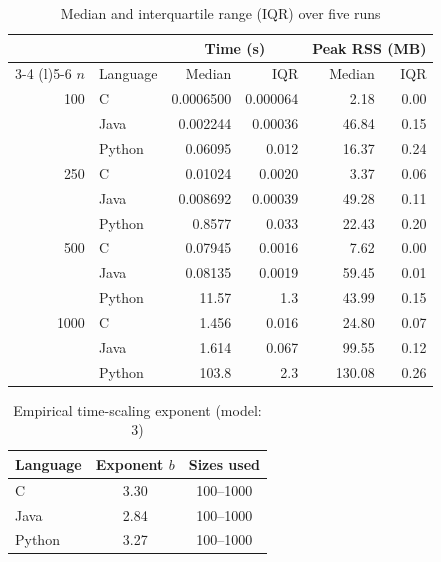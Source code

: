 \documentclass[conference,a4paper]{IEEEtran}
\begin{document}
\begin{table}[t]
  \centering
  \caption{Median and interquartile range (IQR) over five runs}
  \label{tab:summary}
  \footnotesize
  \setlength{\tabcolsep}{4.5pt}
  \begin{tabular}{@{}rlrrrr@{}}
    \toprule
    & & \multicolumn{2}{c}{\textbf{Time (s)}} & \multicolumn{2}{c}{\textbf{Peak RSS (MB)}} \\
    \cmidrule(lr){3-4} \cmidrule(l){5-6}
    $n$ & Language & Median & IQR & Median & IQR \\
    \midrule
    100  & C      & 0.0006500 & 0.000064 & 2.18 & 0.00 \\
         & Java   & 0.002244 & 0.00036 & 46.84 & 0.15 \\
         & Python & 0.06095 & 0.012 & 16.37 & 0.24 \\
    \midrule
    250  & C      & 0.01024 & 0.0020 & 3.37 & 0.06 \\
         & Java   & 0.008692 & 0.00039 & 49.28 & 0.11 \\
         & Python & 0.8577 & 0.033 & 22.43 & 0.20 \\
    \midrule
    500  & C      & 0.07945 & 0.0016 & 7.62 & 0.00 \\
         & Java   & 0.08135 & 0.0019 & 59.45 & 0.01 \\
         & Python & 11.57 & 1.3 & 43.99 & 0.15 \\
    \midrule
    1000 & C      & 1.456 & 0.016 & 24.80 & 0.07 \\
         & Java   & 1.614 & 0.067 & 99.55 & 0.12 \\
         & Python & 103.8 & 2.3 & 130.08 & 0.26 \\
    \bottomrule
  \end{tabular}
\end{table}

\begin{table}[t]
  \centering
  \caption{Empirical time-scaling exponent (model: 3)}
  \label{tab:exponents}
  \footnotesize
  \begin{tabular}{@{}lcc@{}}
    \toprule
    Language & Exponent $b$ & Sizes used \\
    \midrule
    C      & 3.30 & 100--1000 \\
    Java   & 2.84 & 100--1000 \\
    Python & 3.27 & 100--1000 \\
    \bottomrule
  \end{tabular}
\end{table}
\end{document}
